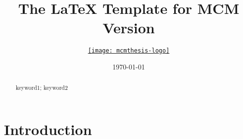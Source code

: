 \documentclass{mcmthesis}
\title{The \LaTeX{} Template for MCM Version \MCMversion}
\author{\small \href{http://www.latexstudio.net/}
  {\texttt{[image: mcmthesis-logo]}}}
\date{\today}
\begin{document}
\begin{abstract}
\lipsum[1]
\begin{keywords}
keyword1; keyword2
\end{keywords}
\end{abstract}
\maketitle
\tableofcontents



\newpage
\section{Introduction}
\end{document}
